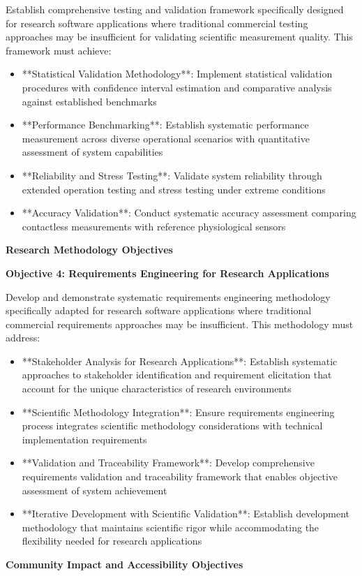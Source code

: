 \documentclass[12pt,a4paper]{report}
\begin{document}
Establish comprehensive testing and validation framework specifically designed for research software applications where
traditional commercial testing approaches may be insufficient for validating scientific measurement quality. This
framework must achieve:

\begin{itemize}
\item **Statistical Validation Methodology**: Implement statistical validation procedures with confidence interval
  estimation and comparative analysis against established benchmarks
\item **Performance Benchmarking**: Establish systematic performance measurement across diverse operational scenarios with
  quantitative assessment of system capabilities
\item **Reliability and Stress Testing**: Validate system reliability through extended operation testing and stress testing
  under extreme conditions
\item **Accuracy Validation**: Conduct systematic accuracy assessment comparing contactless measurements with reference
  physiological sensors

\end{itemize}
\textbf{Research Methodology Objectives}

\textbf{Objective 4: Requirements Engineering for Research Applications}

Develop and demonstrate systematic requirements engineering methodology specifically adapted for research software
applications where traditional commercial requirements approaches may be insufficient. This methodology must address:

\begin{itemize}
\item **Stakeholder Analysis for Research Applications**: Establish systematic approaches to stakeholder identification and
  requirement elicitation that account for the unique characteristics of research environments
\item **Scientific Methodology Integration**: Ensure requirements engineering process integrates scientific methodology
  considerations with technical implementation requirements
\item **Validation and Traceability Framework**: Develop comprehensive requirements validation and traceability framework
  that enables objective assessment of system achievement
\item **Iterative Development with Scientific Validation**: Establish development methodology that maintains scientific
  rigor while accommodating the flexibility needed for research applications

\end{itemize}
\textbf{Community Impact and Accessibility Objectives}
\end{document}
